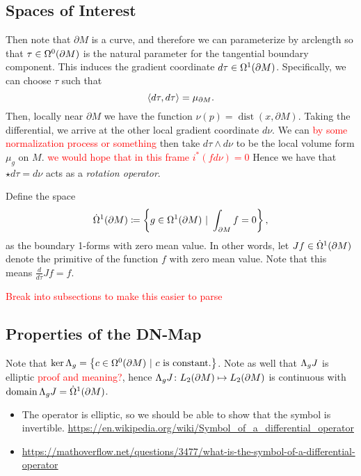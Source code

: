 \documentclass[12pt]{article}
\begin{document}
\subsection{Spaces of Interest}

Then note that $\partial M$ is a curve, and therefore we can parameterize by arclength so that $\tau \in \Omega^{0}(\partial M)$ is the natural parameter for the tangential boundary component. This induces the gradient coordinate $d\tau \in \Omega^{1}(\partial M)$. Specifically, we can choose $\tau$ such that 
\[
\left\langle d\tau, d\tau\right\rangle = \mu_{\partial M}.
\]
Then, locally near $\partial M$ we have the function $\nu(p) = \operatorname{dist}(x,\partial M)$. Taking the differential, we arrive at the other local gradient coordinate $d\nu$. We can \textcolor{red}{by some normalization process or something} then take $d\tau \wedge d\nu$ to be the local volume form $\mu_g$ on $M$.  \textcolor{red}{we would hope that in this frame $i^*(fd\nu)=0$} Hence we have that $\star d\tau = d\nu$ acts as a \emph{rotation operator}.  

Define the space 
\[
\dot{\Omega}^1(\partial M) \coloneqq \left\{ g \in \Omega^{1}(\partial M) ~\vert~ \int_{\partial M} f = 0 \right\},
\]
as the boundary 1-forms with zero mean value.  In other words, let $Jf \in \dot{\Omega}^1(\partial M)$ denote the primitive of the function $f$ with zero mean value.  Note that this means $\frac{d}{d\tau} Jf = f.$

\textcolor{red}{Break into subsections to make this easier to parse}

\subsection{Properties of the DN-Map}
Note that $\ker \Lambda_g = \left\{c \in \Omega^{0}(\partial M) ~\vert~ c \textrm{~is constant.}\right\}$. Note as well that $\Lambda_g J$ is elliptic \textcolor{red}{proof and meaning?}, hence $\Lambda_g J \colon L_2(\partial M) \mapsto L_2(\partial M)$ is continuous with $\operatorname{domain} \Lambda_g J = \dot{\Omega}^1(\partial M)$.

\begin{itemize}
	\item The operator is elliptic, so we should be able to show that the symbol is invertible.  \url{https://en.wikipedia.org/wiki/Symbol_of_a_differential_operator}
	\item \url{https://mathoverflow.net/questions/3477/what-is-the-symbol-of-a-differential-operator}
\end{itemize}
\end{document}
